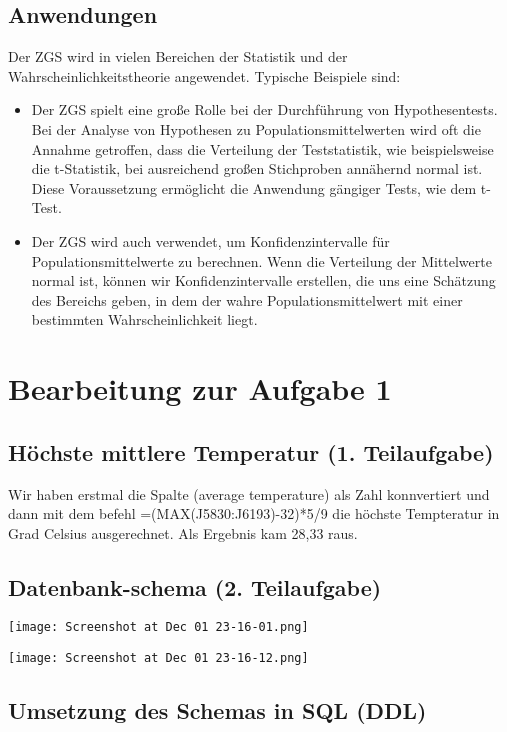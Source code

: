 \documentclass{article}
\begin{document}
\subsection{Anwendungen}
Der ZGS wird in vielen Bereichen der Statistik und der Wahrscheinlichkeitstheorie angewendet. Typische Beispiele sind:

\begin{itemize}
    \item Der ZGS spielt eine große Rolle bei der Durchführung von Hypothesentests. Bei der Analyse von Hypothesen zu Populationsmittelwerten wird oft die Annahme getroffen, dass die Verteilung der Teststatistik, wie beispielsweise die t-Statistik, bei ausreichend großen Stichproben annähernd normal ist. Diese Voraussetzung ermöglicht die Anwendung gängiger Tests, wie dem t-Test.

    
\item Der ZGS wird auch verwendet, um Konfidenzintervalle für Populationsmittelwerte zu berechnen. Wenn die Verteilung der Mittelwerte normal ist, können wir Konfidenzintervalle erstellen, die uns eine Schätzung des Bereichs geben, in dem der wahre Populationsmittelwert mit einer bestimmten Wahrscheinlichkeit liegt.




\end{itemize}

\newpage
\section{Bearbeitung zur Aufgabe 1}

\subsection{Höchste mittlere Temperatur (1. Teilaufgabe)}
Wir haben erstmal die Spalte (average temperature) als Zahl konnvertiert und dann mit dem befehl =(MAX(J5830:J6193)-32)*5/9 die höchste Tempteratur in Grad Celsius ausgerechnet. Als Ergebnis kam 28,33 raus.

\subsection{Datenbank-schema (2. Teilaufgabe)}



\texttt{[image: Screenshot at Dec 01 23-16-01.png]}

\texttt{[image: Screenshot at Dec 01 23-16-12.png]}

\subsection{Umsetzung des Schemas in SQL (DDL)}
\end{document}
